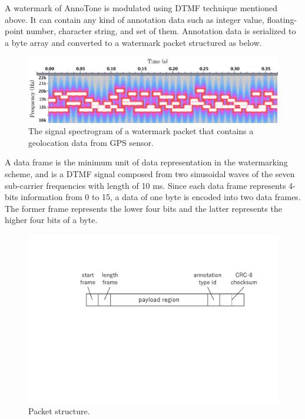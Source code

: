A watermark of AnnoTone is modulated using DTMF technique mentioned above.
It can contain any kind of annotation data such as integer value, floating-point number, character string, and set of them.
Annotation data is serialized to a byte array and converted to a watermark packet structured as below.

\begin{figure}[htbp]
 \begin{center}
  \includegraphics[width=120mm]{watermarking_spectrogram.png}
 \end{center}
 \caption{The signal spectrogram of a watermark packet that contains a geolocation data from GPS sensor.}
 \label{fig:watr_spec}
\end{figure}

A data frame is the minimum unit of data representation in the watermarking scheme, and is a DTMF signal composed from two sinusoidal waves of the seven sub-carrier frequencies with length of 10 ms.
Since each data frame represents 4-bits information from 0 to 15, a data of one byte is encoded into two data frames.
The former frame represents the lower four bits and the latter represents the higher four bits of a byte.

\begin{figure}[htbp]
 \begin{center}
  \vspace{5mm}
  \includegraphics[width=120mm]{watermarking_packet.pdf}
 \end{center}
 \caption{Packet structure.}
 \label{fig:watr_pack}
\end{figure}

